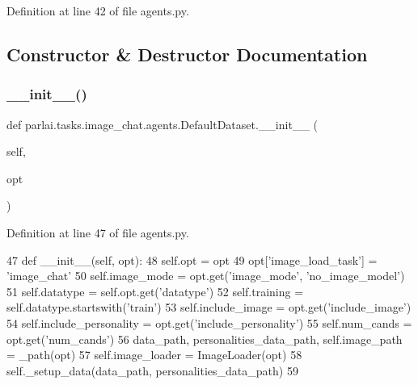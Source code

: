 Definition at line 42 of file agents.\+py.



\subsection{Constructor \& Destructor Documentation}
\mbox{\label{classparlai_1_1tasks_1_1image__chat_1_1agents_1_1DefaultDataset_a4459f064418d6dbeb9e00da5ac54c49c}} 
\subsubsection{\texorpdfstring{\+\_\+\+\_\+init\+\_\+\+\_\+()}{\_\_init\_\_()}}
{\footnotesize\ttfamily def parlai.\+tasks.\+image\+\_\+chat.\+agents.\+Default\+Dataset.\+\_\+\+\_\+init\+\_\+\+\_\+ (\begin{DoxyParamCaption}\item[{}]{self,  }\item[{}]{opt }\end{DoxyParamCaption})}



Definition at line 47 of file agents.\+py.


\begin{DoxyCode}
47     \textcolor{keyword}{def }\_\_init\_\_(self, opt):
48         self.opt = opt
49         opt[\textcolor{stringliteral}{'image\_load\_task'}] = \textcolor{stringliteral}{'image\_chat'}
50         self.image\_mode = opt.get(\textcolor{stringliteral}{'image\_mode'}, \textcolor{stringliteral}{'no\_image\_model'})
51         self.datatype = self.opt.get(\textcolor{stringliteral}{'datatype'})
52         self.training = self.datatype.startswith(\textcolor{stringliteral}{'train'})
53         self.include\_image = opt.get(\textcolor{stringliteral}{'include\_image'})
54         self.include\_personality = opt.get(\textcolor{stringliteral}{'include\_personality'})
55         self.num\_cands = opt.get(\textcolor{stringliteral}{'num\_cands'})
56         data\_path, personalities\_data\_path, self.image\_path = \_path(opt)
57         self.image\_loader = ImageLoader(opt)
58         self.\_setup\_data(data\_path, personalities\_data\_path)
59 
\end{DoxyCode}


